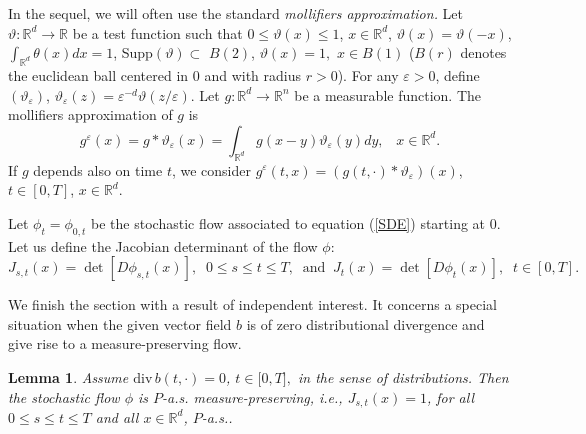 \documentclass[a4paper,10pt]{article}
\newtheorem{lemma}[theorem]{Lemma}
\begin{document}
In the sequel, we will often use the standard \textit{mollifiers
approximation.} Let $\vartheta: {\mathbb{R}} ^{d} \to{\mathbb{R}}
$ be a test function such that $0 \le\vartheta(x) \le1$, $x
\in{\mathbb{R}} ^{d}$, $\vartheta (x)= \vartheta (-x)$,
$\int_{{\mathbb{R}} ^{d}} \theta(x)dx =1$, Supp$(\vartheta)
\subset$ $B(2)$, $\vartheta(x) =1, $ $x \in B(1)$ ($B(r)$ denotes
the euclidean ball centered in 0 and with radius $r>0$). For any
${\varepsilon} >0$, define $(\vartheta_{{\varepsilon} }) $,
$\vartheta_{{\varepsilon} } (z) = {{\varepsilon} }^{-d}
\vartheta(z / {\varepsilon} )$. Let $g : {\mathbb{R}} ^{d}
\to{\mathbb{R}} ^{n}$ be a measurable function. The mollifiers
approximation of $g$ is
\begin{equation} \label{molli}
g^{{\varepsilon} }(x) = g * \vartheta_{{\varepsilon} } (x) =
\int_{{\mathbb{R}} ^{d}} g(x-y) \vartheta_{{\varepsilon} } (y)
dy,\;\;\; x \in{\mathbb{R}} ^{d}.
\end{equation}
If $g$ depends also on time $t$, we consider $g^{\varepsilon}(t,
x) = (g(t, \cdot) * \vartheta_{{\varepsilon} }) (x)$, $t
\in[0,T]$, $x \in \mathbb{R} ^d$.

{{\vskip2mm \noindent}} Let $\phi_{t} = \phi_{0,t}$ be the
stochastic flow associated to equation (\ref{SDE}) starting at
$0$. Let us  define  the Jacobian determinant of the flow $\phi $:
\[
J_{s,t}(x) = \det [D \phi_{s,t}(x)],\;\; 0 \le s \le t \le T, \;\;
\mbox{and}\;\; J_{t}(x) = \det [D \phi_{t}(x)],\;\; t \in [0,T].
\]



We finish the section with a result of independent
interest. It concerns a special situation when the given vector field $b$ is
of zero distributional divergence and give rise to a measure-preserving flow.

\begin{lemma}
\label{lemma change} Assume ${\mathrm{div}\,}b(t,\cdot)=0$,
$t\in\lbrack0,T],$ in the sense of distributions. Then the
stochastic flow $\phi$ is $P$-a.s. measure-preserving, i.e.,
$J_{s,t}(x)=1$, for all $0\leq s\leq t\leq T$ and all
$x\in{\mathbb{R}}^{d}$, $P$-a.s..
\end{lemma}
\end{document}
